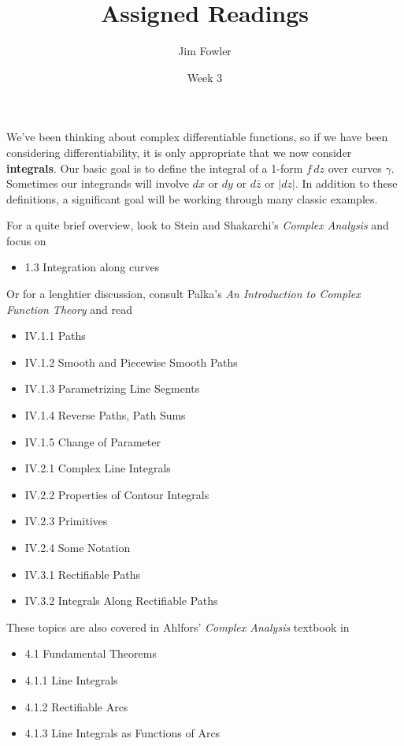 \documentclass{homework}
\author{Jim Fowler}
\title{Assigned Readings}
\date{Week 3}
\begin{document}
\maketitle

We've been thinking about complex differentiable functions, so if we
have been considering differentiability, it is only appropriate that
we now consider \textbf{integrals}.  Our basic goal is to define the
integral of a 1-form $f\,dz$ over curves $\gamma$.  Sometimes our
integrands will involve $dx$ or $dy$ or $d\bar{z}$ or $|dz|$.  In
addition to these definitions, a significant goal will be working
through many classic examples.

For a quite brief overview, look to Stein and Shakarchi's
\textit{Complex Analysis} and focus on
\begin{itemize}
\item 1.3 Integration along curves
\end{itemize}
Or for a lenghtier discussion, consult Palka's \textit{An Introduction to Complex Function Theory} and read
\begin{itemize}
\item IV.1.1 Paths
\item IV.1.2 Smooth and Piecewise Smooth Paths
\item IV.1.3 Parametrizing Line Segments
\item IV.1.4 Reverse Paths, Path Sums
\item IV.1.5 Change of Parameter
\item IV.2.1 Complex Line Integrals
\item IV.2.2 Properties of Contour Integrals
\item IV.2.3 Primitives
\item IV.2.4 Some Notation
\item IV.3.1 Rectifiable Paths
\item IV.3.2 Integrals Along Rectifiable Paths
\end{itemize}
These topics are also covered in Ahlfors' \textit{Complex Analysis}
textbook in
\begin{itemize}
\item 4.1 Fundamental Theorems
\item 4.1.1 Line Integrals
\item 4.1.2 Rectifiable Arcs
\item 4.1.3 Line Integrals as Functions of Arcs
\end{itemize}
\end{document}
